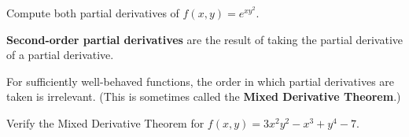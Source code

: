 \documentclass[letterpaper, twoside, 12pt]{book}
\begin{document}
          \begin{solution}

          \end{solution}

          \begin{problem}
            Compute both partial derivatives of $f(x,y)=e^{xy^2}$.
          \end{problem}

          \begin{solution}

          \end{solution}

\begin{definition}
  \textbf{Second-order partial derivatives} are the result of taking the
  partial derivative of a partial derivative.
\end{definition}

\begin{theorem}
  For sufficiently well-behaved functions, the order in which partial
  derivatives are taken is irrelevant. (This is sometimes called the
  \textbf{Mixed Derivative Theorem}.)
\end{theorem}

          \begin{problem}
            Verify the Mixed Derivative Theorem for
            $f(x,y)=3x^2y^2-x^3+y^4-7$.
          \end{problem}

          \begin{solution}

          \end{solution}
\end{document}
